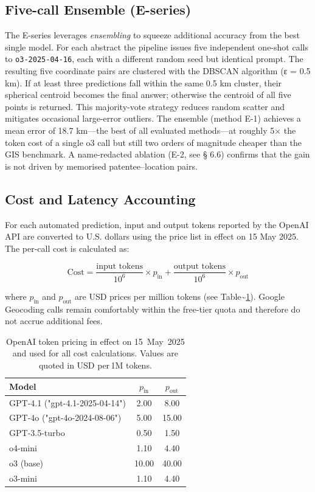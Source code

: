 \documentclass[
  10pt]{article}
\providecommand{\passthrough}[1]{#1}
\begin{document}
\subsection{Five-call Ensemble
(E-series)}\label{five-call-ensemble-e-series}

The E-series leverages \emph{ensembling} to squeeze additional accuracy
from the best single model. For each abstract the pipeline issues five
independent one-shot calls to \passthrough{\lstinline!o3-2025-04-16!},
each with a different random seed but identical prompt. The resulting
five coordinate pairs are clustered with the DBSCAN algorithm (ε = 0.5
km). If at least three predictions fall within the same 0.5 km cluster,
their spherical centroid becomes the final answer; otherwise the
centroid of all five points is returned. This majority-vote strategy
reduces random scatter and mitigates occasional large-error outliers.
The ensemble (method E-1) achieves a mean error of 18.7 km---the best of
all evaluated methods---at roughly 5× the token cost of a single o3 call
but still two orders of magnitude cheaper than the GIS benchmark. A
name-redacted ablation (E-2, see § 6.6) confirms that the gain is not
driven by memorised patentee--location pairs.

\subsection{Cost and Latency
Accounting}\label{cost-and-latency-accounting}

For each automated prediction, input and output tokens reported by the
OpenAI API are converted to U.S. dollars using the price list in effect
on 15 May 2025. The per-call cost is calculated as:

\[
\text{Cost} = \frac{\text{input tokens}}{10^{6}} \times p_{\text{in}} + \frac{\text{output tokens}}{10^{6}} \times p_{\text{out}}
\]

where \(p_{\text{in}}\) and \(p_{\text{out}}\) are USD prices per
million tokens (see Table\textasciitilde{}\ref{tbl:prices}). Google
Geocoding calls remain comfortably within the free-tier quota and
therefore do not accrue additional fees.

\begin{table}[H]
\centering
\caption{OpenAI token pricing in effect on 15~May~2025 and used for all cost calculations.  Values are quoted in USD per\,1M tokens.}
\label{tbl:prices}
\begin{tabular}{lcc}
\toprule
Model & $p_{\text{in}}$ & $p_{\text{out}}$ \\
\midrule
GPT-4.1 ("gpt-4.1-2025-04-14") & 2.00 & 8.00 \\
GPT-4o ("gpt-4o-2024-08-06") & 5.00 & 15.00 \\
GPT-3.5-turbo & 0.50 & 1.50 \\
o4-mini & 1.10 & 4.40 \\
o3 (base) & 10.00 & 40.00 \\
o3-mini & 1.10 & 4.40 \\
\bottomrule
\end{tabular}
\end{table}
\end{document}
